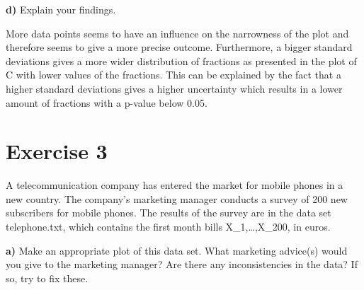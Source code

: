\documentclass[
]{article}
\newenvironment{Shaded}{\begin{snugshade}}{\end{snugshade}}
\newcommand{\AttributeTok}[1]{\textcolor[rgb]{0.77,0.63,0.00}{#1}}
\newcommand{\CommentTok}[1]{\textcolor[rgb]{0.56,0.35,0.01}{\textit{#1}}}
\newcommand{\ConstantTok}[1]{\textcolor[rgb]{0.00,0.00,0.00}{#1}}
\newcommand{\DecValTok}[1]{\textcolor[rgb]{0.00,0.00,0.81}{#1}}
\newcommand{\FunctionTok}[1]{\textcolor[rgb]{0.00,0.00,0.00}{#1}}
\newcommand{\NormalTok}[1]{#1}
\newcommand{\OtherTok}[1]{\textcolor[rgb]{0.56,0.35,0.01}{#1}}
\newcommand{\SpecialCharTok}[1]{\textcolor[rgb]{0.00,0.00,0.00}{#1}}
\newcommand{\StringTok}[1]{\textcolor[rgb]{0.31,0.60,0.02}{#1}}
\begin{document}
\textbf{d)} Explain your findings.

More data points seems to have an influence on the narrowness of the
plot and therefore seems to give a more precise outcome. Furthermore, a
bigger standard deviations gives a more wider distribution of fractions
as presented in the plot of C with lower values of the fractions. This
can be explained by the fact that a higher standard deviations gives a
higher uncertainty which results in a lower amount of fractions with a
p-value below 0.05.

\hypertarget{exercise-3}{%
\section{Exercise 3}\label{exercise-3}}

A telecommunication company has entered the market for mobile phones in
a new country. The company's marketing manager conducts a survey of 200
new subscribers for mobile phones. The results of the survey are in the
data set telephone.txt, which contains the first month bills
X\_1,\ldots,X\_200, in euros.

\textbf{a)} Make an appropriate plot of this data set. What marketing
advice(s) would you give to the marketing manager? Are there any
inconsistencies in the data? If so, try to fix these.

\begin{Shaded}
\end{Shaded}
\end{document}
